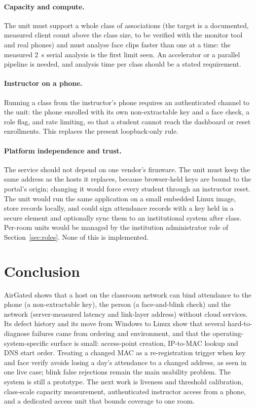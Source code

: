 \documentclass[11pt,a4paper]{article}
\newcommand{\sys}{AirGated}
\begin{document}
\paragraph{Capacity and compute.} The unit must support a whole class of associations (the target is a documented, measured client count above the class size, to be verified with the monitor tool and real phones) and must analyse face clips faster than one at a time: the measured 2~s serial analysis is the first limit seen. An accelerator or a parallel pipeline is needed, and analysis time per class should be a stated requirement.

\paragraph{Instructor on a phone.} Running a class from the instructor's phone requires an authenticated channel to the unit: the phone enrolled with its own non-extractable key and a face check, a role flag, and rate limiting, so that a student cannot reach the dashboard or reset enrollments. This replaces the present loopback-only rule.

\paragraph{Platform independence and trust.} The service should not depend on one vendor's firmware. The unit must keep the same address as the hosts it replaces, because browser-held keys are bound to the portal's origin; changing it would force every student through an instructor reset. The unit would run the same application on a small embedded Linux image, store records locally, and could sign attendance records with a key held in a secure element and optionally sync them to an institutional system after class. Per-room units would be managed by the institution administrator role of Section~\ref{sec:roles}. None of this is implemented.

\section{Conclusion}
\sys{} shows that a host on the classroom network can bind attendance to the phone (a non-extractable key), the person (a face-and-blink check) and the network (server-measured latency and link-layer address) without cloud services. Its defect history and its move from Windows to Linux show that several hard-to-diagnose failures came from ordering and environment, and that the operating-system-specific surface is small: access-point creation, IP-to-MAC lookup and DNS start order. Treating a changed MAC as a re-registration trigger when key and face verify avoids losing a day's attendance to a changed address, as seen in one live case; blink false rejections remain the main usability problem. The system is still a prototype. The next work is liveness and threshold calibration, class-scale capacity measurement, authenticated instructor access from a phone, and a dedicated access unit that bounds coverage to one room.
\end{document}
